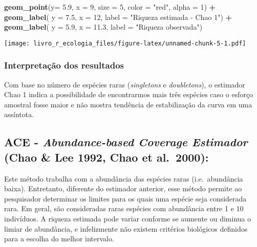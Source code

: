 \documentclass[
]{book}
\newenvironment{Shaded}{\begin{snugshade}}{\end{snugshade}}
\newcommand{\DataTypeTok}[1]{\textcolor[rgb]{0.13,0.29,0.53}{#1}}
\newcommand{\DecValTok}[1]{\textcolor[rgb]{0.00,0.00,0.81}{#1}}
\newcommand{\FloatTok}[1]{\textcolor[rgb]{0.00,0.00,0.81}{#1}}
\newcommand{\KeywordTok}[1]{\textcolor[rgb]{0.13,0.29,0.53}{\textbf{#1}}}
\newcommand{\NormalTok}[1]{#1}
\newcommand{\OperatorTok}[1]{\textcolor[rgb]{0.81,0.36,0.00}{\textbf{#1}}}
\newcommand{\StringTok}[1]{\textcolor[rgb]{0.31,0.60,0.02}{#1}}
\begin{document}
\begin{Shaded}
\begin{Highlighting}[]
\StringTok{  }\KeywordTok{geom_point}\NormalTok{(}\DataTypeTok{y=} \FloatTok{5.9}\NormalTok{, }\DataTypeTok{x =} \DecValTok{9}\NormalTok{, }\DataTypeTok{size =} \DecValTok{5}\NormalTok{, }\DataTypeTok{color =} \StringTok{"red"}\NormalTok{, }\DataTypeTok{alpha =} \DecValTok{1}\NormalTok{) }\OperatorTok{+}\StringTok{ }
\StringTok{  }\KeywordTok{geom_label}\NormalTok{( }\DataTypeTok{y =} \FloatTok{7.5}\NormalTok{, }\DataTypeTok{x =} \DecValTok{12}\NormalTok{, }\DataTypeTok{label =} \StringTok{"Riqueza estimada - Chao 1"}\NormalTok{) }\OperatorTok{+}
\StringTok{  }\KeywordTok{geom_label}\NormalTok{( }\DataTypeTok{y =} \FloatTok{5.9}\NormalTok{, }\DataTypeTok{x =} \FloatTok{11.3}\NormalTok{, }\DataTypeTok{label =} \StringTok{"Riqueza observada"}\NormalTok{)}
\end{Highlighting}
\end{Shaded}

\texttt{[image: livro\_r\_ecologia\_files/figure-latex/unnamed-chunk-5-1.pdf]}

\hypertarget{interpretauxe7uxe3o-dos-resultados-2}{%
\subsubsection{Interpretação dos resultados}\label{interpretauxe7uxe3o-dos-resultados-2}}

Com base no número de espécies raras (\emph{singletons} e \emph{doubletons}), o estimador Chao 1 indica a possibilidade de encontrarmos mais três espécies caso o esforço amostral fosse maior e não mostra tendência de estabilização da curva em uma assíntota.

\hypertarget{ace---abundance-based-coverage-estimador-chao-lee-1992-chao-et-al.-2000}{%
\subsection{\texorpdfstring{ACE - \emph{Abundance-based Coverage Estimador} (Chao \& Lee 1992, Chao et al.~2000):}{ACE - Abundance-based Coverage Estimador (Chao \& Lee 1992, Chao et al.~2000):}}\label{ace---abundance-based-coverage-estimador-chao-lee-1992-chao-et-al.-2000}}

Este método trabalha com a abundância das espécies raras (i.e.~abundância baixa). Entretanto, diferente do estimador anterior, esse método permite ao pesquisador determinar os limites para os quais uma espécie seja considerada rara. Em geral, são consideradas raras espécies com abundância entre 1 e 10 indivíduos. A riqueza estimada pode variar conforme se aumente ou diminua o limiar de abundância, e infelizmente não existem critérios biológicos definidos para a escolha do melhor intervalo.
\end{document}
